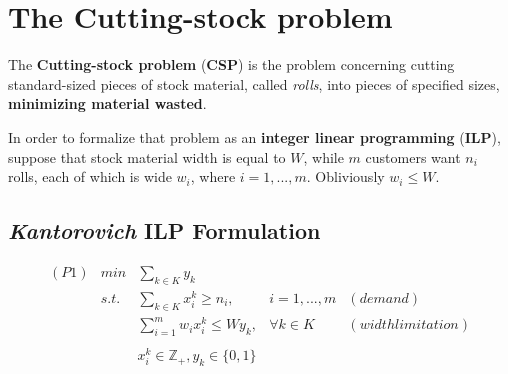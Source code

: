 \documentclass[10pt,a4paper]{article}
\begin{document}
\begin{frontespizio} 
\end{frontespizio} 

\tableofcontents
\newpage


\section{The Cutting-stock problem}

The \textbf{Cutting-stock problem} (\textbf{CSP}) is the problem concerning cutting standard-sized pieces of stock material, called \textit{rolls}, into pieces of specified sizes, \textbf{minimizing material wasted}.

In order to formalize that problem as an \textbf{integer linear programming} (\textbf{ILP}), suppose that stock material width is equal to $W$, while $m$ customers want $n_i$ rolls, each of which is wide $w_i$, where $i = 1,...,m$. Obliviously $w_i \leq W$.

\subsection{\textit{Kantorovich} ILP Formulation }



\begin{equation}\label{eqn:P1}
\begin{array} {lllrr} 

(P1) & min & \displaystyle\sum_{k \in K} y_k && \\
& s.t. & \displaystyle\sum_{k \in K} x_i^k \geq n_i, & i = 1,...,m & (demand) \\
&& \displaystyle\sum_{i = 1}^m w_i x_i^k \leq W y_k, & \forall k \in K & (width limitation) \\\\
&& x_i^k \in \mathbb{Z}_{+}, y_k \in \lbrace 0, 1 \rbrace &&
\end{array}
\end{equation}



\end{document}
